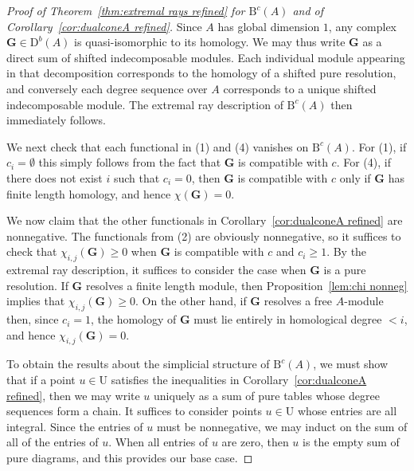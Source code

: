 \documentclass[12pt]{amsart}
\theoremstyle{definition}
\theoremstyle{remark}
\newcommand{\UU}{\mathrm{U}}
\newcommand{\cc}{c}
\newcommand{\Gbull}{\mathbf{G}}
\newcommand{\nothing}{\emptyset}
\newcommand{\DD}{\mathrm{D}}
\newcommand{\BBQ}{\mathrm{B}}
\begin{document}
\begin{proof}[Proof of Theorem~\ref{thm:extremal rays refined} for $\BBQ^{\cc}(A)$ and of Corollary~\ref{cor:dualconeA refined}]

Since $A$ has global dimension $1$, any complex $\Gbull\in \DD^b(A)$ is quasi-isomorphic to its homology.  We may thus write $\Gbull$ as a direct sum of shifted indecomposable modules.  Each individual module appearing in that decomposition corresponds to the homology of a shifted pure resolution, and conversely each  degree sequence over $A$ corresponds to a unique shifted indecomposable module.  The extremal ray description of $\BBQ^{\cc}(A)$ then immediately follows.

We next check that each functional in (1) and (4) vanishes on $\BBQ^{\cc}(A)$.  For (1), if $c_i=\nothing$ this simply follows from the fact that $\Gbull$ is compatible with $\cc$.  For (4), if there does not exist $i$ such that $c_i=0$, then $\Gbull$ is compatible with $\cc$ only if $\Gbull$ has finite length homology, and hence $\chi(\Gbull)=0$.  

We now claim that the other functionals in Corollary~\ref{cor:dualconeA refined} are nonnegative.  The functionals from (2) are obviously nonnegative, so it suffices to check that $\chi_{i,j}(\Gbull)\geq 0$ when $\Gbull$ is compatible with $\cc$ and $c_i\geq 1$.  By the extremal ray description, it suffices to consider the case when $\Gbull$ is a pure resolution.  If $\Gbull$ resolves a finite length module, then Proposition~\ref{lem:chi nonneg} implies that $\chi_{i,j}(\Gbull)\geq 0$.  On the other hand, if $\Gbull$ resolves a free $A$-module then, since $c_i=1$, the homology of $\Gbull$ must lie entirely in homological degree $<i$, and hence $\chi_{i,j}(\Gbull)=0$.

To obtain the results about the simplicial structure of $\BBQ^{\cc}(A)$, we must show that if a point $u\in \UU$ satisfies the inequalities in Corollary~\ref{cor:dualconeA refined}, then we may write $u$ uniquely as a sum of pure tables whose degree sequences form a chain.  It suffices to consider points $u\in \UU$ whose entries are all integral.  Since the entries of $u$ must be nonnegative, we may induct on the sum of all of the entries of $u$.  When all entries of $u$ are zero, then $u$ is the empty sum of pure diagrams, and this provides our base case.


\end{proof}
\end{document}
